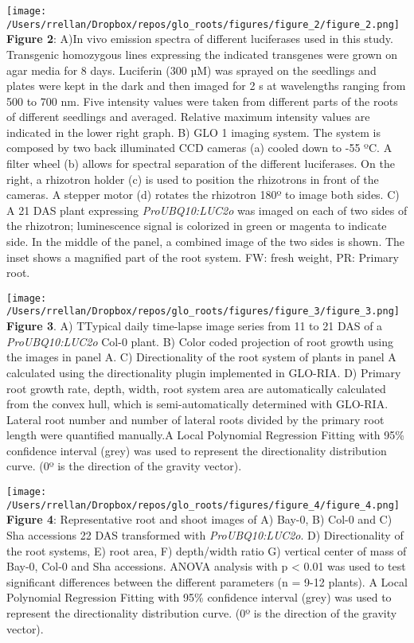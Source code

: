 \documentclass[]{article}
\begin{document}
\texttt{[image: /Users/rrellan/Dropbox/repos/glo\_roots/figures/figure\_2/figure\_2.png]}\\\textbf{Figure
2}: A)In vivo emission spectra of different luciferases used in this
study. Transgenic homozygous lines expressing the indicated transgenes
were grown on agar media for 8 days. Luciferin (300 µM) was sprayed on
the seedlings and plates were kept in the dark and then imaged for 2 s
at wavelengths ranging from 500 to 700 nm. Five intensity values were
taken from different parts of the roots of different seedlings and
averaged. Relative maximum intensity values are indicated in the lower
right graph. B) GLO 1 imaging system. The system is composed by two back
illuminated CCD cameras (a) cooled down to -55 ºC. A filter wheel (b)
allows for spectral separation of the different luciferases. On the
right, a rhizotron holder (c) is used to position the rhizotrons in
front of the cameras. A stepper motor (d) rotates the rhizotron 180º to
image both sides. C) A 21 DAS plant expressing \emph{ProUBQ10:LUC2o} was
imaged on each of two sides of the rhizotron; luminescence signal is
colorized in green or magenta to indicate side. In the middle of the
panel, a combined image of the two sides is shown. The inset shows a
magnified part of the root system. FW: fresh weight, PR: Primary root.

\texttt{[image: /Users/rrellan/Dropbox/repos/glo\_roots/figures/figure\_3/figure\_3.png]}\\\textbf{Figure
3}. A) TTypical daily time-lapse image series from 11 to 21 DAS of a
\emph{ProUBQ10:LUC2o} Col-0 plant. B) Color coded projection of root
growth using the images in panel A. C) Directionality of the root system
of plants in panel A calculated using the directionality plugin
implemented in GLO-RIA. D) Primary root growth rate, depth, width, root
system area are automatically calculated from the convex hull, which is
semi-automatically determined with GLO-RIA. Lateral root number and
number of lateral roots divided by the primary root length were
quantified manually.A Local Polynomial Regression Fitting with 95\%
confidence interval (grey) was used to represent the directionality
distribution curve. (0º is the direction of the gravity vector).

\texttt{[image: /Users/rrellan/Dropbox/repos/glo\_roots/figures/figure\_4/figure\_4.png]}\\\textbf{Figure
4}: Representative root and shoot images of A) Bay-0, B) Col-0 and C)
Sha accessions 22 DAS transformed with \emph{ProUBQ10:LUC2o}. D)
Directionality of the root systems, E) root area, F) depth/width ratio
G) vertical center of mass of Bay-0, Col-0 and Sha accessions. ANOVA
analysis with p \textless{} 0.01 was used to test significant
differences between the different parameters (n = 9-12 plants). A Local
Polynomial Regression Fitting with 95\% confidence interval (grey) was
used to represent the directionality distribution curve. (0º is the
direction of the gravity vector).
\end{document}
